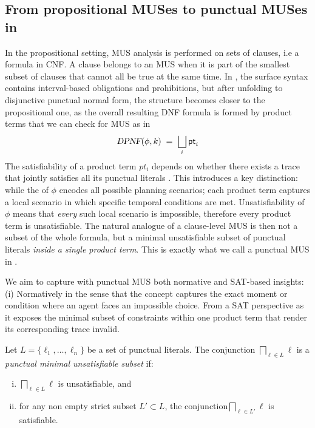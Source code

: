 \subsection{From propositional MUSes to punctual MUSes in \TDDLfm}

In the propositional setting, MUS analysis is performed on sets of clauses, i.e a formula in CNF.
A clause belongs to an MUS when it is part of the smallest subset of clauses that cannot all be true at the same time. 
In \TDDLfm, the surface syntax contains interval-based obligations and prohibitions, but after unfolding to disjunctive punctual normal form, the structure becomes closer to the propositional one, as the overall resulting DNF formula is formed by product terms that we can check for MUS
 as in 
$$\textsl{DPNF}(\phi,k) \;=\; \bigsqcup_i \mathsf{pt}_i$$
 The satisfiability of a product term $ pt_i$ depends on whether there exists a trace that jointly satisfies all its punctual literals . This introduces a key distinction: while the \dpnf of $\phi$
 encodes all possible planning scenarios; each product term captures a local scenario in which specific temporal conditions are met.
Unsatisfiability of \(\phi\) means that \emph{every} such local scenario is impossible, therefore every product term is unsatisfiable. The natural analogue of a clause-level MUS is then not a subset of the whole formula, but a minimal unsatisfiable subset of punctual literals \emph{inside a single product term}. 
This is exactly what we call a punctual MUS in \TDDLfm.

We aim to capture with punctual MUS both normative and SAT-based insights: (i) Normatively in the sense that the concept captures the exact moment or condition where an agent faces an impossible choice. From a SAT perspective as it exposes the minimal subset of constraints within one product term that render its corresponding trace invalid.

\begin{definition}\label{def:punctual-MUS}
Let \(L=\{\ell_1,\dots,\ell_n\}\) be a set of punctual literals.
The conjunction \(\bigsqcap_{\ell\in L}\ell\) is a \emph{punctual minimal unsatisfiable subset} if:
\begin{enumerate}[(i)]
  \item \(\bigsqcap_{\ell\in L}\ell\) is unsatisfiable, and
  \item for any non empty strict subset \(L'\subset L\), the conjunction\(\bigsqcap_{\ell\in L'}\ell\) is satisfiable.
\end{enumerate}
\end{definition}

